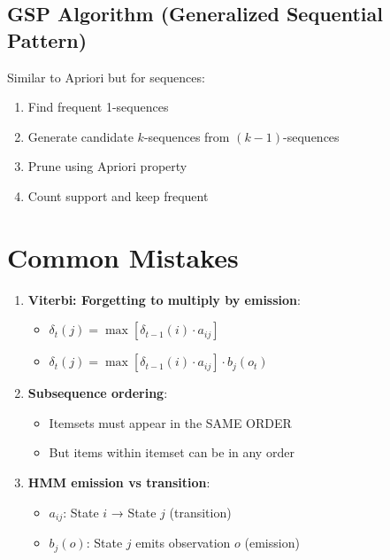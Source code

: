 \subsection{GSP Algorithm (Generalized Sequential Pattern)}

\begin{infobox}
Similar to Apriori but for sequences:
\begin{enumerate}
    \item Find frequent 1-sequences
    \item Generate candidate $k$-sequences from $(k-1)$-sequences
    \item Prune using Apriori property
    \item Count support and keep frequent
\end{enumerate}
\end{infobox}

\section{Common Mistakes}

\begin{warningbox}
\begin{enumerate}
    \item \textbf{Viterbi: Forgetting to multiply by emission}:
    \begin{itemize}
        \item[$\times$] $\delta_t(j) = \max[\delta_{t-1}(i) \cdot a_{ij}]$
        \item[\checkmark] $\delta_t(j) = \max[\delta_{t-1}(i) \cdot a_{ij}] \cdot b_j(o_t)$
    \end{itemize}

    \item \textbf{Subsequence ordering}:
    \begin{itemize}
        \item Itemsets must appear in the SAME ORDER
        \item But items within itemset can be in any order
    \end{itemize}

    \item \textbf{HMM emission vs transition}:
    \begin{itemize}
        \item $a_{ij}$: State $i$ → State $j$ (transition)
        \item $b_j(o)$: State $j$ emits observation $o$ (emission)
    \end{itemize}
\end{enumerate}
\end{warningbox}

